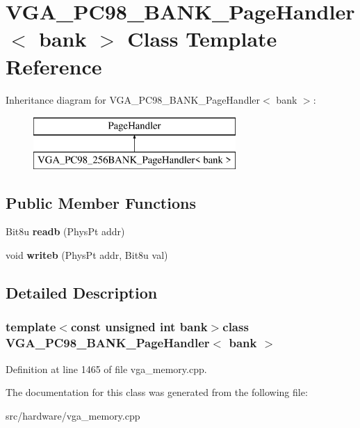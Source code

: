 \hypertarget{classVGA__PC98__256BANK__PageHandler}{\section{V\-G\-A\-\_\-\-P\-C98\-\_\-B\-A\-N\-K\-\_\-\-Page\-Handler$<$ bank $>$ Class Template Reference}
\label{classVGA__PC98__256BANK__PageHandler}
}
Inheritance diagram for V\-G\-A\-\_\-\-P\-C98\-\_\-B\-A\-N\-K\-\_\-\-Page\-Handler$<$ bank $>$\-:\begin{figure}[H]
\begin{center}
\leavevmode
\includegraphics[height=2.000000cm]{classVGA__PC98__256BANK__PageHandler}
\end{center}
\end{figure}
\subsection*{Public Member Functions}
\begin{DoxyCompactItemize}
\item 
\hypertarget{classVGA__PC98__256BANK__PageHandler_adbacfa3281ce5bb5c96cfeb433b58ff8}{Bit8u {\bfseries readb} (Phys\-Pt addr)}\label{classVGA__PC98__256BANK__PageHandler_adbacfa3281ce5bb5c96cfeb433b58ff8}

\item 
\hypertarget{classVGA__PC98__256BANK__PageHandler_ad86422e0c5069c8aa68c1c4ece4c5a13}{void {\bfseries writeb} (Phys\-Pt addr, Bit8u val)}\label{classVGA__PC98__256BANK__PageHandler_ad86422e0c5069c8aa68c1c4ece4c5a13}

\end{DoxyCompactItemize}


\subsection{Detailed Description}
\subsubsection*{template$<$const unsigned int bank$>$class V\-G\-A\-\_\-\-P\-C98\-\_\-B\-A\-N\-K\-\_\-\-Page\-Handler$<$ bank $>$}



Definition at line 1465 of file vga\-\_\-memory.\-cpp.



The documentation for this class was generated from the following file\-:\begin{DoxyCompactItemize}
\item 
src/hardware/vga\-\_\-memory.\-cpp\end{DoxyCompactItemize}
